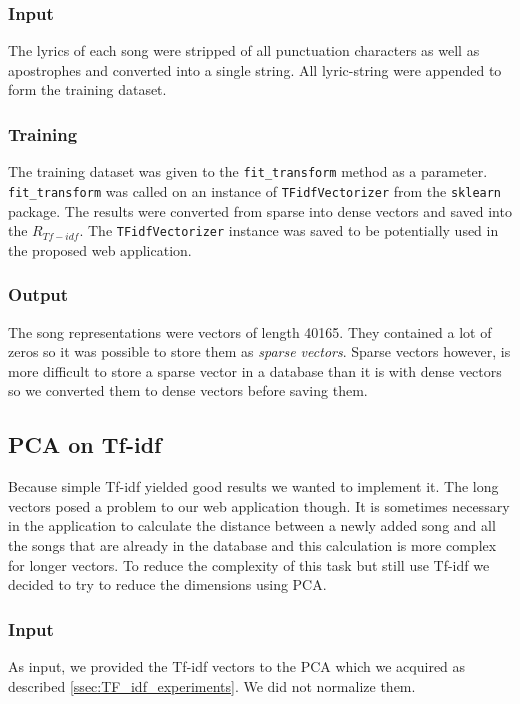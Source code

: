 \subsubsection{Input}
The lyrics of each song were stripped of all punctuation characters as well as apostrophes and converted into a single string. All lyric-string were appended to form the training dataset.
\subsubsection{Training}
The training dataset was given to the \texttt{fit\_transform} method as a parameter. \texttt{fit\_transform} was called on an instance of \texttt{TFidfVectorizer} from the \texttt{sklearn} package. The results were converted from sparse into dense vectors and saved into the $R_{Tf-idf}$. The \texttt{TFidfVectorizer} instance was saved to be potentially used in the proposed web application. \\

\subsubsection{Output}
The song representations were vectors of length 40165. They contained a lot of zeros so it was possible to store them as \textit{sparse vectors}. Sparse vectors however, is more difficult to store a sparse vector in a database than it is with dense vectors so we converted them to dense vectors before saving them.

\subsection{PCA on Tf-idf}\label{ssec:PCA_on_tf_idf_experiments}

Because simple Tf-idf yielded good results we wanted to implement it. The long vectors posed a problem to our web application though. It is sometimes necessary in the application to calculate the distance between a newly added song and all the songs that are already in the database and this calculation is more complex for longer vectors. To reduce the complexity of this task but still use Tf-idf we decided to try to reduce the dimensions using PCA.

\subsubsection{Input}
As input, we provided the Tf-idf vectors to the PCA which we acquired as described \ref{ssec:TF_idf_experiments}. We did not normalize them.

